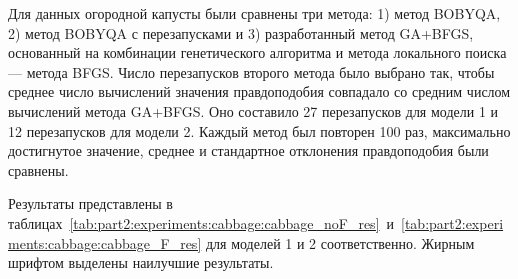 Для данных огородной капусты были сравнены три метода: 1) метод BOBYQA, 2) метод BOBYQA с перезапусками и 3) разработанный метод GA+BFGS, основанный на комбинации генетического алгоритма и метода локального поиска --- метода BFGS.
Число перезапусков второго метода было выбрано так, чтобы среднее число вычислений значения правдоподобия совпадало со средним числом вычислений метода GA+BFGS.
Оно составило 27 перезапусков для модели 1 и 12 перезапусков для модели 2.
Каждый метод был повторен 100 раз, максимально достигнутое значение, среднее и стандартное отклонения правдоподобия были сравнены. 

Результаты представлены в таблицах~\ref{tab:part2:experiments:cabbage:cabbage_noF_res}~и~\ref{tab:part2:experiments:cabbage:cabbage_F_res} для моделей 1 и 2 соответственно.
Жирным шрифтом выделены наилучшие результаты.

\begin{table}[ht]
    \centering
    \caption{Результаты 100 повторов различных методов для поиска параметров модели 1 без инбридинга демографической истории одной популяции огородной капусты}
    \label{tab:part2:experiments:cabbage:cabbage_noF_res}
\end{table}

